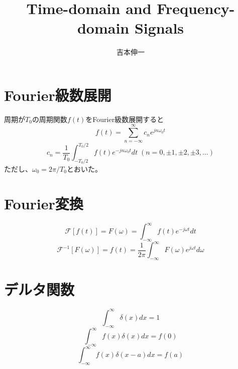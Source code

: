 \documentclass[]{jlreq}
\theoremstyle{definition}
\begin{document}
\title{Time-domain and Frequency-domain Signals}
\author{吉本伸一}
\maketitle
\tableofcontents
\clearpage

\section{Fourier級数展開}
周期が$T_0$の周期関数$f(t)$をFourier級数展開すると
%
\begin{equation}
  f(t) = \sum_{n=-\infty}^{\infty} c_n e^{j n \omega_0 t}
  \label{fourier_series}
\end{equation}
%
\begin{equation}
  c_n = \frac{1}{T_0} \int_{-T_0/2}^{T_0/2} f(t) e^{- j n \omega_0 t} dt　\; (n = 0, \pm 1, \pm 2, \pm 3, \dots)
  \label{fourier_coef}
\end{equation}
%
ただし、$\omega_0 = 2\pi/T_0$とおいた。
%
\section{Fourier変換}
\begin{equation}
  \mathcal{F}[f(t)] = F(\omega) = \int_{-\infty}^{\infty} f(t) e^{-j\omega t} dt
\end{equation}
\begin{equation}
  \mathcal{F}^{-1}[F(\omega)] = f(t) = \frac{1}{2\pi}\int_{-\infty}^{\infty} F(\omega) e^{j\omega t} d\omega
\end{equation}

\section{デルタ関数}
\begin{equation}
  \int_{-\infty}^{\infty} \delta (x) dx = 1
\end{equation}
%
\begin{equation}
  \int_{-\infty}^{\infty} f(x) \delta (x) dx = f(0)
\end{equation}
%
\begin{equation}
  \int_{-\infty}^{\infty} f(x) \delta (x - a) dx = f(a)
\end{equation}
%
\end{document}

